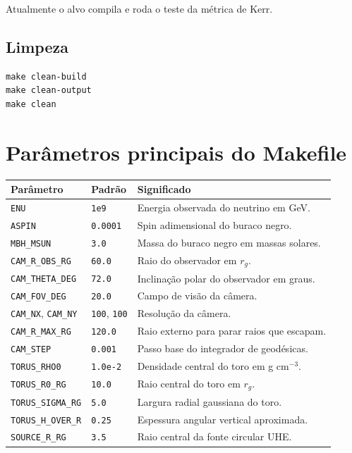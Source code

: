 \documentclass[11pt,a4paper]{article}
\begin{document}
Atualmente o alvo compila e roda o teste da métrica de Kerr.

\subsection{Limpeza}

\begin{verbatim}
make clean-build
make clean-output
make clean
\end{verbatim}

\section{Parâmetros principais do Makefile}

\begin{longtable}{llp{7.3cm}}
\toprule
Parâmetro & Padrão & Significado\\
\midrule
\endhead
\texttt{ENU} & \texttt{1e9} & Energia observada do neutrino em GeV.\\
\texttt{ASPIN} & \texttt{0.0001} & Spin adimensional do buraco negro.\\
\texttt{MBH\_MSUN} & \texttt{3.0} & Massa do buraco negro em massas solares.\\
\texttt{CAM\_R\_OBS\_RG} & \texttt{60.0} & Raio do observador em $r_g$.\\
\texttt{CAM\_THETA\_DEG} & \texttt{72.0} & Inclinação polar do observador em graus.\\
\texttt{CAM\_FOV\_DEG} & \texttt{20.0} & Campo de visão da câmera.\\
\texttt{CAM\_NX}, \texttt{CAM\_NY} & \texttt{100}, \texttt{100} & Resolução da câmera.\\
\texttt{CAM\_R\_MAX\_RG} & \texttt{120.0} & Raio externo para parar raios que escapam.\\
\texttt{CAM\_STEP} & \texttt{0.001} & Passo base do integrador de geodésicas.\\
\texttt{TORUS\_RHO0} & \texttt{1.0e-2} & Densidade central do toro em g cm$^{-3}$.\\
\texttt{TORUS\_R0\_RG} & \texttt{10.0} & Raio central do toro em $r_g$.\\
\texttt{TORUS\_SIGMA\_RG} & \texttt{5.0} & Largura radial gaussiana do toro.\\
\texttt{TORUS\_H\_OVER\_R} & \texttt{0.25} & Espessura angular vertical aproximada.\\
\texttt{SOURCE\_R\_RG} & \texttt{3.5} & Raio central da fonte circular UHE.\\

\end{longtable}
\end{document}
